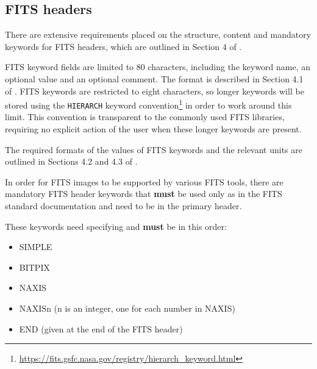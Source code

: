 \documentclass[a4paper,10pt,bibtotoc]{scrartcl}
\begin{document}
\subsection{FITS headers}

There are extensive requirements placed on the structure, content and mandatory keywords for FITS headers, which are outlined in Section 4 of \cite{FITSv3.0}. 

FITS keyword fields are limited to 80 characters, including the keyword name, an optional value and an optional comment. The format is described in Section 4.1 of \cite{FITSv3.0}. FITS keywords are restricted to eight characters, so longer keywords will be stored using the \texttt{HIERARCH} keyword convention\footnote{\url{https://fits.gsfc.nasa.gov/registry/hierarch_keyword.html}} in order to work around this limit. This convention is transparent to the commonly used FITS libraries, requiring no explicit action of the user when these longer keywords are present.

The required formats of the values of FITS keywords and the relevant units are outlined in Sections 4.2 and 4.3 of \cite{FITSv3.0}. 

In order for FITS images to be supported by various FITS tools, there are mandatory FITS header keywords that {\bf must} be used only as in the FITS standard documentation \citep[Section 4.4;][]{FITSv3.0} and need to be in the primary header.

These keywords need specifying and {\bf must} be in this order:
\begin{itemize}
    \item SIMPLE
    \item BITPIX
    \item NAXIS
    \item NAXISn (n is an integer, one for each number in NAXIS)
    \item END (given at the end of the FITS header)
\end{itemize}
\end{document}

